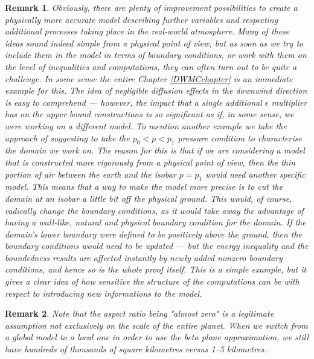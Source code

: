 \documentclass[12pt]{report}
\numberwithin{theorem}{chapter}
\numberwithin{corollary}{chapter}
\numberwithin{lemma}{chapter}
\newtheorem{remark}{Remark}
\numberwithin{remark}{chapter}
\numberwithin{definition}{chapter}
\numberwithin{prop}{chapter}
\begin{document}
\begin{remark}
\normalfont
Obviously, there are plenty of improvement possibilities to create a physically more accurate model describing further variables and respecting additional processes taking place in the real-world atmosphere. Many of these ideas sound indeed simple from a physical point of view, but as soon as we try to include them in the model in terms of boundary conditions, or work with them on the level of inequalities and computations, they can often turn out to be quite a challenge. In some sense the entire Chapter \ref{DWMCchapter} is an immediate example for this. The idea of negligible diffusion effects in the downwind direction is easy to comprehend --- however, the impact that a single additional $\epsilon$ multiplier has on the upper bound constructions is so significant as if, in some sense, we were working on a different model. To mention another example we take the approach of \cite{temam2005some} suggesting to take the $p_0 < p < p_1$ pressure condition to characterise the domain we work on. The reason for this is that if we are considering a model that is constructed more rigorously from a physical point of view, then the thin portion of air between the earth and the isobar $p = p_1$ would need another specific model. This means that a way to make the model more precise is to cut the domain at an isobar a little bit off the physical ground. This would, of course, radically change the boundary conditions, as it would take away the advantage of having a wall-like, natural and physical boundary condition for the domain. If the domain's lower boundary were defined to be positively above the ground, then the boundary conditions would need to be updated --- but the energy inequality and the boundedness results are affected instantly by newly added nonzero boundary conditions, and hence so is the whole proof itself. This is a simple example, but it gives a clear idea of how sensitive the structure of the computations can be with respect to introducing new informations to the model.
\end{remark}

\begin{remark}
\normalfont Note that the aspect ratio being "almost zero" is a legitimate assumption not exclusively on the scale of the entire planet. When we switch from a global model to a local one in order to use the beta plane approximation, we still have hundreds of thousands of square kilometres versus 1--5 kilometres.
\end{remark}
\end{document}
